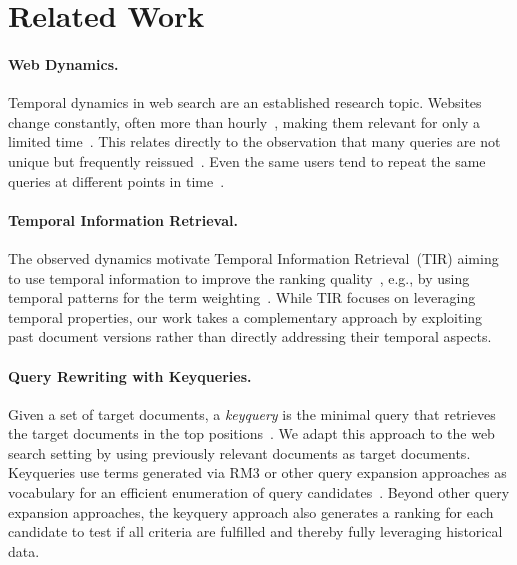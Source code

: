 \section{Related Work}
\label{sec:related-work}

\paragraph{Web Dynamics.} Temporal dynamics in web search are an established research topic. Websites change constantly, often more than hourly~\cite{DBLP:conf/wsdm/AdarTDE09}, making them relevant for only a limited time~\cite{DBLP:conf/sigir/TikhonovBBOKG13}. This relates directly to the observation that many queries are not unique but frequently reissued~\cite{DBLP:conf/sigir/Dumais14,DBLP:journals/sigir/SilversteinHMM99}. Even the same users tend to repeat the same queries at different points in time~\cite{DBLP:conf/wsdm/TylerT10}.

\paragraph{Temporal Information Retrieval.} The observed dynamics motivate Temporal Information Retrieval~(TIR) aiming to use temporal information to improve the ranking quality~\cite{DBLP:journals/ftir/KanhabuaBN15,DBLP:journals/csur/CamposDJJ14}, e.g., by using temporal patterns for the term weighting~\cite{DBLP:conf/wsdm/ElsasD10}. While TIR focuses on leveraging temporal properties, our work takes a complementary approach by exploiting past document versions rather than directly addressing their temporal aspects.


\paragraph{Query Rewriting with Keyqueries.} Given a set of target documents, a \emph{keyquery} is the minimal query that retrieves the target documents in the top positions~\cite{gollub:2013a,hagen:2016b}. We adapt this approach to the web search setting by using previously relevant documents as target documents. Keyqueries use terms generated via RM3 or other query expansion approaches as vocabulary for an efficient enumeration of query candidates~\cite{froebe:2022c,froebe:2021c}. Beyond other query expansion approaches, the keyquery approach also generates a ranking for each candidate to test if all criteria are fulfilled and thereby fully leveraging historical data. 

